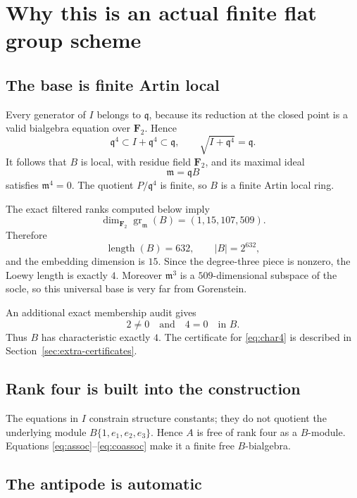\documentclass[11pt]{article}
\theoremstyle{remark}
\newcommand{\F}{\mathbf F}
\newcommand{\gr}{\operatorname{gr}}
\newcommand{\length}{\operatorname{length}}
\newcommand{\q}{\mathfrak q}
\newcommand{\m}{\mathfrak m}
\begin{document}
\section{Why this is an actual finite flat group scheme}

\subsection{The base is finite Artin local}

Every generator of \(I\) belongs to \(\q\), because its reduction at the
closed point is a valid bialgebra equation over \(\F_2\).  Hence
\[
  \q^4\subset I+\q^4\subset\q,
  \qquad \sqrt{I+\q^4}=\q.
\]
It follows that \(B\) is local, with residue field \(\F_2\), and its maximal
ideal
\[
  \m=\q B
\]
satisfies \(\m^4=0\).  The quotient \(P/\q^4\) is finite, so \(B\) is a
finite Artin local ring.

The exact filtered ranks computed below imply
\begin{equation}\label{eq:hilbert}
 \dim_{\F_2}\gr_{\m}(B)=(1,15,107,509).
\end{equation}
Therefore
\[
 \length(B)=632,\qquad |B|=2^{632},
\]
and the embedding dimension is \(15\).  Since the degree-three piece is
nonzero, the Loewy length is exactly \(4\).  Moreover \(\m^3\) is a
\(509\)-dimensional subspace of the socle, so this universal base is very far
from Gorenstein.

An additional exact membership audit gives
\begin{equation}\label{eq:char4}
  2\ne0\quad\text{and}\quad4=0\quad\text{in }B.
\end{equation}
Thus \(B\) has characteristic exactly \(4\).  The certificate for
\eqref{eq:char4} is described in Section~\ref{sec:extra-certificates}.

\subsection{Rank four is built into the construction}

The equations in \(I\) constrain structure constants; they do not quotient
the underlying module \(B\{1,e_1,e_2,e_3\}\).  Hence \(A\) is free of rank
four as a \(B\)-module.  Equations \eqref{eq:assoc}--\eqref{eq:coassoc}
make it a finite free \(B\)-bialgebra.

\subsection{The antipode is automatic}
\end{document}
